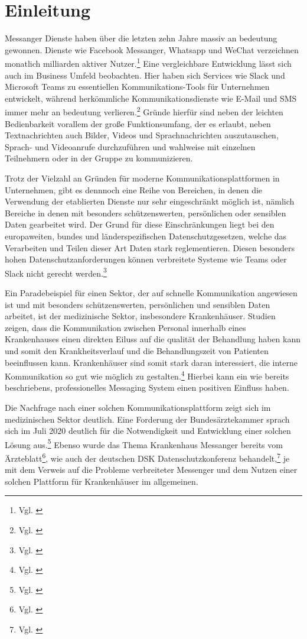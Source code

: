\chapter{Einleitung}\label{chapter:einleitung}

Messanger Dienste haben über die letzten zehn Jahre massiv an bedeutung gewonnen. Dienste wie Facebook Messanger, Whatsapp und WeChat verzeichnen monatlich milliarden aktiver Nutzer.\footnote{Vgl. \cite{Ballve2014}} Eine vergleichbare Entwicklung lässt sich auch im Business Umfeld beobachten. Hier haben sich Services wie Slack und Microsoft Teams zu essentiellen Kommunikations-Tools für Unternehmen entwickelt, während herkömmliche Kommunikationsdienste wie E-Mail und SMS immer mehr an bedeutung verlieren.\footnote{Vgl. \cite{Richter2019}}
Gründe hierfür sind neben der leichten Bedienbarkeit vorallem der große Funktionsumfang, der es erlaubt, neben Textnachrichten auch Bilder, Videos und Sprachnachrichten auszutauschen, Sprach- und Videoanrufe durchzuführen und wahlweise mit einzelnen Teilnehmern oder in der Gruppe zu kommunizieren.

Trotz der Vielzahl an Gründen für moderne Kommunikationsplattformen in Unternehmen, gibt es dennnoch eine Reihe von Bereichen, in denen die Verwendung der etablierten Dienste nur sehr eingeschränkt möglich ist, nämlich Bereiche in denen mit besonders schützenswerten, persönlichen oder sensiblen Daten gearbeitet wird. Der Grund für diese Einschränkungen liegt bei den europaweiten, bundes und länderspezifischen Datenschutzgesetzen, welche das Verarbeiten und Teilen dieser Art Daten stark reglementieren. Diesen besonders hohen Datenschutzanforderungen können verbreitete Systeme wie Teams oder Slack nicht gerecht werden.\footnote{Vgl. \cite{Datenschutzkonferenz2019}}

Ein Paradebeispiel für einen Sektor, der auf schnelle Kommunikation angewiesen ist und mit besonders schützenswerten, persönlichen und sensiblen Daten arbeitet, ist der medizinische Sektor, insbesondere Krankenhäuser. Studien zeigen, dass die Kommunikation zwischen Personal innerhalb eines Krankenhauses einen direkten Eiluss auf die qualität der Behandlung haben kann und somit den Krankheitsverlauf und die Behandlungszeit von Patienten beeinflussen kann. Krankenhäuser sind somit stark daran interessiert, die interne Kommunikation so gut wie möglich zu gestalten.\footnote{Vgl. \cite{G.Murphy2010}} Hierbei kann ein wie bereits beschriebens, professionelles Messaging System einen positiven Einfluss haben.

Die Nachfrage nach einer solchen Kommunikationsplattform zeigt sich im medizinischen Sektor deutlich. Eine Forderung der Bundesärztekammer sprach sich im Juli 2020 deutlich für die Notwendigkeit und Entwicklung einer solchen Lösung aus.\footnote{Vgl. \cite{Bundesaerztekammer2019}} Ebenso wurde das Thema Krankenhaus Messanger bereits vom Ärzteblatt\footnote{Vgl. \cite{Giesselmann2018}}, wie auch der deutschen DSK Datenschutzkonferenz behandelt,\footnote{Vgl. \cite{Datenschutzkonferenz2019}} je mit dem Verweis auf die Probleme verbreiteter Messenger und dem Nutzen einer solchen Plattform für Krankenhäuser im allgemeinen.

